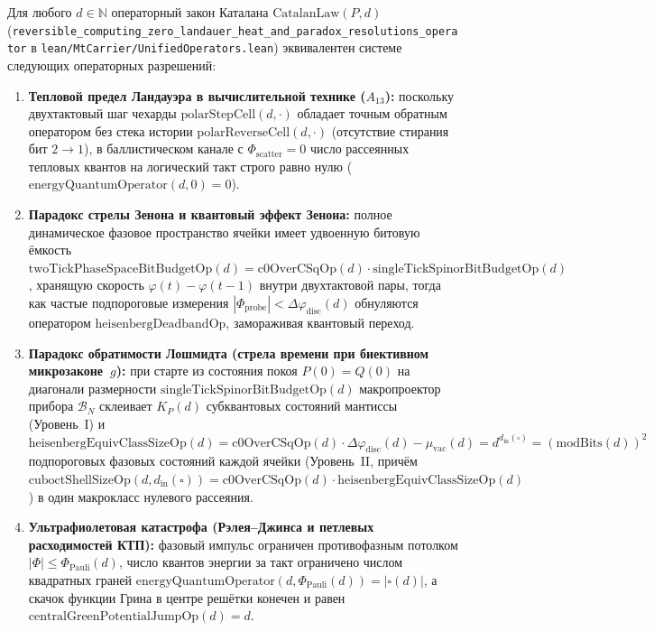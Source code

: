 \begin{theorem}
\label{thm:applied-landauer-and-seven-paradoxes}
Для любого $d\in\mathbb{N}$ операторный закон Каталана $\mathrm{CatalanLaw}(P,d)$ (\texttt{reversible\_computing\_zero\_landauer\_heat\_and\_paradox\_resolutions\_operator} в \texttt{lean/MtCarrier/UnifiedOperators.lean}) эквивалентен системе следующих операторных разрешений:
\begin{enumerate}[label=\textbf{(\roman*)},leftmargin=*]
\item \textbf{Тепловой предел Ландауэра в вычислительной технике ($A_{13}$):}
  поскольку двухтактовый шаг чехарды $\mathrm{polarStepCell}(d,\cdot)$ обладает точным обратным оператором без стека истории $\mathrm{polarReverseCell}(d,\cdot)$ (отсутствие стирания бит $2\to 1$), в баллистическом канале с $\Phi_{\mathrm{scatter}}=0$ число рассеянных тепловых квантов на логический такт строго равно нулю ($\mathrm{energyQuantumOperator}(d,0) = 0$).
\item \textbf{Парадокс стрелы Зенона и квантовый эффект Зенона:}
  полное динамическое фазовое пространство ячейки имеет удвоенную битовую ёмкость $\mathrm{twoTickPhaseSpaceBitBudgetOp}(d) = \mathrm{c0OverCSqOp}(d)\cdot\mathrm{singleTickSpinorBitBudgetOp}(d)$, хранящую скорость $\varphi(t)-\varphi(t-1)$ внутри двухтактовой пары, тогда как частые подпороговые измерения $|\Phi_{\mathrm{probe}}| < \Delta\varphi_{\mathrm{disc}}(d)$ обнуляются оператором $\mathrm{heisenbergDeadbandOp}$, замораживая квантовый переход.
\item \textbf{Парадокс обратимости Лошмидта (стрела времени при биективном микрозаконе~$g$):}
  при старте из состояния покоя $P(0)=Q(0)$ на диагонали размерности $\mathrm{singleTickSpinorBitBudgetOp}(d)$ макропроектор прибора $\mathcal{B}_N$ склеивает $K_P(d)$ субквантовых состояний мантиссы (Уровень~I) и $\mathrm{heisenbergEquivClassSizeOp}(d) = \mathrm{c0OverCSqOp}(d)\cdot\Delta\varphi_{\mathrm{disc}}(d)-\mu_{\mathrm{vac}}(d) = d^{d_{\mathrm{in}}(\square)} = (\mathrm{modBits}(d))^2$ подпороговых фазовых состояний каждой ячейки (Уровень~II, причём $\mathrm{cuboctShellSizeOp}(d,d_{\mathrm{in}}(\square)) = \mathrm{c0OverCSqOp}(d)\cdot\mathrm{heisenbergEquivClassSizeOp}(d)$) в один макрокласс нулевого рассеяния.
\item \textbf{Ультрафиолетовая катастрофа (Рэлея--Джинса и петлевых расходимостей КТП):}
  фазовый импульс ограничен противофазным потолком $|\Phi|\le\Phi_{\mathrm{Pauli}}(d)$, число квантов энергии за такт ограничено числом квадратных граней $\mathrm{energyQuantumOperator}(d,\Phi_{\mathrm{Pauli}}(d)) = |\square(d)|$, а скачок функции Грина в центре решётки конечен и равен $\mathrm{centralGreenPotentialJumpOp}(d) = d$.

\end{enumerate}
\end{theorem}
